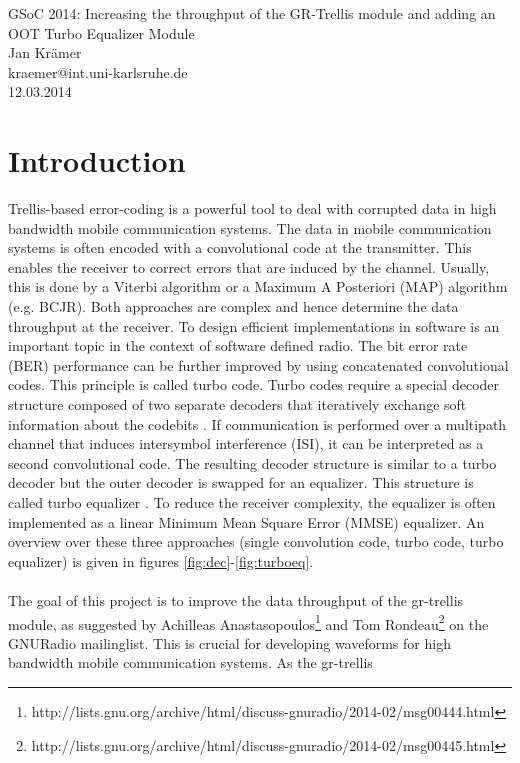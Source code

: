 \documentclass[11pt,		%
	    DIV12,		%
	    a4paper,		%
	    final,		%
	    halfparskip,	%
	    ]{scrartcl}		%
\begin{document}
\begin{center}
{\huge GSoC 2014: Increasing the throughput of the GR-Trellis module and adding an OOT Turbo Equalizer Module}\\[1cm]
{Jan Krämer}\\[0.25cm]
{kraemer@int.uni-karlsruhe.de}\\[0.5cm]
{12.03.2014}\\[0.5cm]
\end{center}
\tableofcontents 
\newpage
\section{Introduction}
Trellis-based error-coding is a powerful tool to deal with corrupted data in high bandwidth mobile communication systems. The data in mobile communication systems is often encoded with a convolutional code at the transmitter. This enables the receiver to correct errors that are induced by the channel. Usually, this is done by a Viterbi algorithm or a Maximum A Posteriori (MAP) algorithm (e.g. BCJR). Both approaches are complex and hence determine the data throughput at the receiver. To design efficient implementations in software is an important topic in the context of software defined radio. The bit error rate (BER) performance can be further improved by using concatenated convolutional codes. This principle is called turbo code. Turbo codes require a special decoder structure composed of two separate decoders that iteratively exchange soft information about the codebits \cite{tc02}. If communication is performed over a multipath channel that induces intersymbol interference (ISI), it can be interpreted as a second convolutional code. The resulting decoder structure is similar to a turbo decoder but the outer decoder is swapped for an equalizer. This structure is called turbo equalizer \cite{te02}. To reduce the receiver complexity, the equalizer is often implemented as a linear Minimum Mean Square Error (MMSE) equalizer. An overview over these three approaches (single convolution code, turbo code, turbo equalizer) is given in figures \ref{fig:dec}-\ref{fig:turboeq}.\\ \\ The goal of this project is to improve the data throughput of the gr-trellis module, as suggested by Achilleas Anastasopoulos\footnote[1]{http://lists.gnu.org/archive/html/discuss-gnuradio/2014-02/msg00444.html} and Tom Rondeau\footnote[2]{http://lists.gnu.org/archive/html/discuss-gnuradio/2014-02/msg00445.html} on the GNURadio mailinglist. This is crucial for developing waveforms for high bandwidth mobile communication systems. As the gr-trellis 
\end{document}
